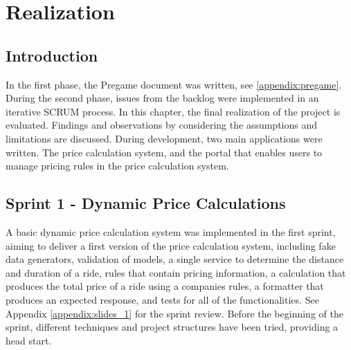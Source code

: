 \graphicspath{{Chapter6/Figs/Vector/}{Chapter6/Figs/}}

%
\chapter{Realization}
\section{Introduction}
In the first phase, the Pregame document was written, see \ref{appendix:pregame}. During the second phase, issues from the backlog were implemented in an iterative SCRUM process. In this chapter, the final realization of the project is evaluated. Findings and observations by considering the assumptions and limitations are discussed. During development, two main applications were written. The price calculation system, and the portal that enables users to manage pricing rules in the price calculation system.

%
\section{Sprint 1 - Dynamic Price Calculations}
A basic dynamic price calculation system was implemented in the first sprint, aiming to deliver a first version of the price calculation system, including fake data generators, validation of models, a single service to determine the distance and duration of a ride, rules that contain pricing information, a calculation that produces the total price of a ride using a companies rules, a formatter that produces an expected response, and tests for all of the functionalities. See Appendix \ref{appendix:slides_1} for the sprint review. Before the beginning of the sprint, different techniques and project structures have been tried, providing a head start.

%
